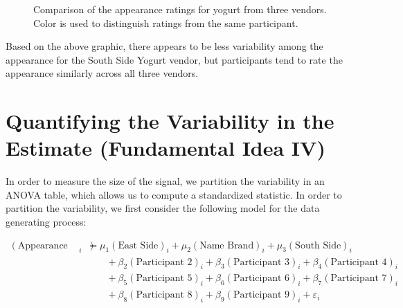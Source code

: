 \documentclass[
  letterpaper,
  DIV=11,
  numbers=noendperiod]{scrreprt}
\theoremstyle{plain}
\theoremstyle{definition}
\theoremstyle{definition}
\theoremstyle{remark}
\begin{document}
\begin{figure}


\caption{\label{fig-blockrecap-plot}Comparison of the appearance ratings
for yogurt from three vendors. Color is used to distinguish ratings from
the same participant.}

\end{figure}%

Based on the above graphic, there appears to be less variability among
the appearance for the South Side Yogurt vendor, but participants tend
to rate the appearance similarly across all three vendors.

\section{Quantifying the Variability in the Estimate (Fundamental Idea
IV)}\label{quantifying-the-variability-in-the-estimate-fundamental-idea-iv-2}

In order to measure the size of the signal, we partition the variability
in an ANOVA table, which allows us to compute a standardized statistic.
In order to partition the variability, we first consider the following
model for the data generating process:

\[
\begin{aligned}
  (\text{Appearance Rating})_i 
    &= \mu_1 (\text{East Side})_i + \mu_2 (\text{Name Brand})_i + \mu_3 (\text{South Side})_i \\
    &\qquad + \beta_2 (\text{Participant 2})_i + \beta_3 (\text{Participant 3})_i + \beta_4 (\text{Participant 4})_i \\
    &\qquad + \beta_5 (\text{Participant 5})_i + \beta_6 (\text{Participant 6})_i + \beta_7 (\text{Participant 7})_i \\
    &\qquad + \beta_8 (\text{Participant 8})_i + \beta_9 (\text{Participant 9})_i + \varepsilon_i
\end{aligned}
\]
\end{document}
